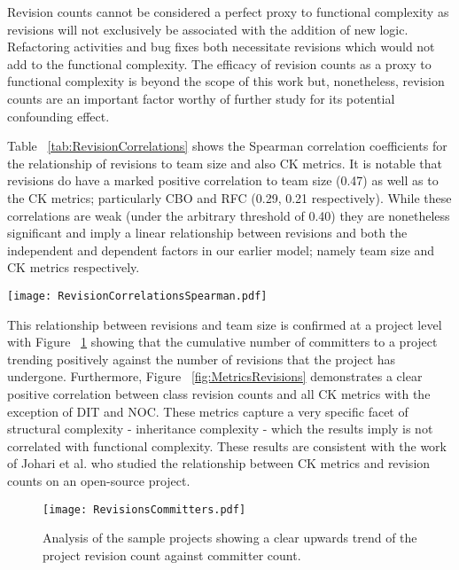 Revision counts cannot be considered a perfect proxy to functional complexity as revisions will not exclusively be associated with the addition of new logic. Refactoring activities and bug fixes both necessitate revisions which would not add to the functional complexity. The efficacy of revision counts as a proxy to functional complexity is beyond the scope of this work but, nonetheless, revision counts are an important factor worthy of further study for its potential confounding effect.

Table ~\ref{tab:RevisionCorrelations} shows the Spearman correlation coefficients for the relationship of revisions to team size and also CK metrics. It is notable that revisions do have a marked positive correlation to team size (0.47) as well as to the CK metrics; particularly CBO and RFC (0.29, 0.21 respectively). While these correlations are weak (under the arbitrary threshold of 0.40) they are nonetheless significant and imply a linear relationship between revisions and both the independent and dependent factors in our earlier model; namely team size and CK metrics respectively.

\begin{table}
\centering 
{}
\begin{tabular}
 \centering 
 \texttt{[image: RevisionCorrelationsSpearman.pdf]}
 \label{tab:RevisionCorrelations}
\end{tabular}
\end{table}

This relationship between revisions and team size is confirmed at a project level with Figure ~\ref{fig:RevisionsCommitters} showing that the cumulative number of committers to a project trending positively against the number of revisions that the project has undergone. Furthermore, Figure ~\ref{fig:MetricsRevisions} demonstrates a clear positive correlation between class revision counts and all CK metrics with the exception of DIT and NOC. These metrics capture a very specific facet of structural complexity - inheritance complexity - which the results imply is not correlated with functional complexity. These results are consistent with the work of Johari et al. \citep{johari2012validation} who studied the relationship between CK metrics and revision counts on an open-source project. 

\begin{figure}[htbp!] 
\centering    
\texttt{[image: RevisionsCommitters.pdf]}
\caption{Analysis of the sample projects showing a clear upwards trend of the project revision count against committer count.}
\label{fig:RevisionsCommitters}
\end{figure}

